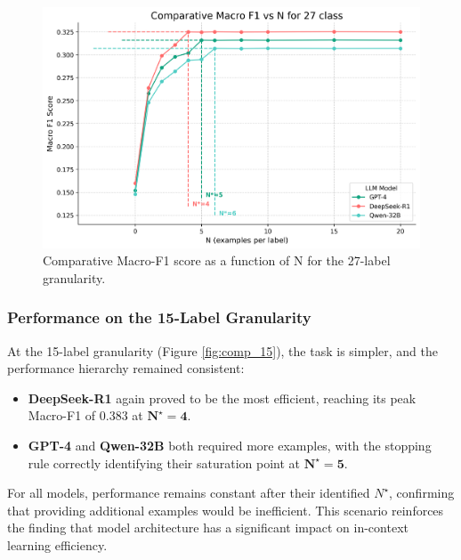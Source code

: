 \begin{figure}[H]
    \centering
    \includegraphics[width=\textwidth]{Images/comparative_27_class.png}
    \caption[Macro-F1 vs. N for 27-Label Granularity]{Comparative Macro-F1 score as a function of N for the 27-label granularity.}
    \label{fig:comp_27}
\end{figure}

\subsubsection{Performance on the 15-Label Granularity}

At the 15-label granularity (Figure \ref{fig:comp_15}), the task is simpler, and the performance hierarchy remained consistent:
\begin{itemize}
    \item \textbf{DeepSeek-R1} again proved to be the most efficient, reaching its peak Macro-F1 of 0.383 at $\mathbf{N^{\star} = 4}$. 
    \item \textbf{GPT-4} and \textbf{Qwen-32B} both required more examples, with the stopping rule correctly identifying their saturation point at $\mathbf{N^{\star} = 5}$. 
\end{itemize}
For all models, performance remains constant after their identified $N^{\star}$, confirming that providing additional examples would be inefficient. This scenario reinforces the finding that model architecture has a significant impact on in-context learning efficiency.

